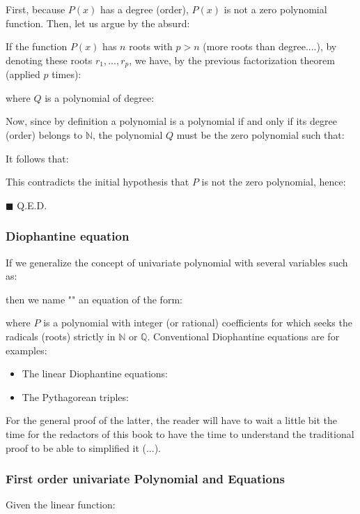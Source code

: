 	\begin{dem}
	First, because $P(x)$ has a degree (order), $P(x)$ is not a zero polynomial function. Then, let us argue by the absurd:
	
	If the function $P(x)$ has $n$ roots with $p>n$ (more roots than degree....), by denoting these roots $r_1,...,r_p$, we have, by the previous  factorization theorem (applied $p$ times):
	
	where $Q$ is a polynomial of degree:
	
	Now, since by definition a polynomial is a polynomial if and only if its degree (order) belongs to  $\mathbb{N}$, the polynomial $Q$ must be the zero polynomial such that:
	
	It follows that:
	
	This contradicts the initial hypothesis that $P$ is not the zero polynomial, hence:
	
	\begin{flushright}
		$\blacksquare$  Q.E.D.
	\end{flushright}
	\end{dem}
	
	\subsubsection{Diophantine equation}\label{diophantine equation}
	If we generalize the concept of univariate polynomial with several variables such as:
	
	then we name "" an equation of the form:
	
	where $P$ is a polynomial with integer (or rational) coefficients for which seeks the radicals (roots) strictly in $\mathbb{N}$ or $\mathbb{Q}$. Conventional Diophantine equations are for examples:
	\begin{itemize}
		\item  The linear Diophantine equations:
		
		
		\item The Pythagorean triples:
			
	\end{itemize}
	For the general proof of the latter, the reader will have to wait a little bit the time for the redactors of this book to have the time to understand the traditional proof to be able to simplified it (...).
	
	\subsubsection{First order univariate Polynomial and Equations}
	Given the linear function:
	
